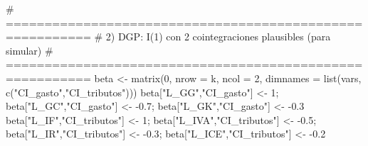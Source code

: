 \documentclass[
  spanish,
  letterpaper,
  DIV=11,
  numbers=noendperiod]{scrartcl}
\newenvironment{Shaded}{\begin{snugshade}}{\end{snugshade}}
\newcommand{\AttributeTok}[1]{\textcolor[rgb]{0.40,0.45,0.13}{#1}}
\newcommand{\CommentTok}[1]{\textcolor[rgb]{0.37,0.37,0.37}{#1}}
\newcommand{\DecValTok}[1]{\textcolor[rgb]{0.68,0.00,0.00}{#1}}
\newcommand{\FloatTok}[1]{\textcolor[rgb]{0.68,0.00,0.00}{#1}}
\newcommand{\FunctionTok}[1]{\textcolor[rgb]{0.28,0.35,0.67}{#1}}
\newcommand{\NormalTok}[1]{\textcolor[rgb]{0.00,0.23,0.31}{#1}}
\newcommand{\OtherTok}[1]{\textcolor[rgb]{0.00,0.23,0.31}{#1}}
\newcommand{\SpecialCharTok}[1]{\textcolor[rgb]{0.37,0.37,0.37}{#1}}
\newcommand{\StringTok}[1]{\textcolor[rgb]{0.13,0.47,0.30}{#1}}
\begin{document}
\begin{Shaded}
\begin{Highlighting}[]
\CommentTok{\# =========================================================}
\CommentTok{\# 2) DGP: I(1) con 2 cointegraciones plausibles (para simular)}
\CommentTok{\# =========================================================}
\NormalTok{beta }\OtherTok{\textless{}{-}} \FunctionTok{matrix}\NormalTok{(}\DecValTok{0}\NormalTok{, }\AttributeTok{nrow =}\NormalTok{ k, }\AttributeTok{ncol =} \DecValTok{2}\NormalTok{, }\AttributeTok{dimnames =} \FunctionTok{list}\NormalTok{(vars, }\FunctionTok{c}\NormalTok{(}\StringTok{"CI\_gasto"}\NormalTok{,}\StringTok{"CI\_tributos"}\NormalTok{)))}
\NormalTok{beta[}\StringTok{"L\_GG"}\NormalTok{,}\StringTok{"CI\_gasto"}\NormalTok{] }\OtherTok{\textless{}{-}} \DecValTok{1}\NormalTok{;   beta[}\StringTok{"L\_GC"}\NormalTok{,}\StringTok{"CI\_gasto"}\NormalTok{] }\OtherTok{\textless{}{-}} \SpecialCharTok{{-}}\FloatTok{0.7}\NormalTok{; beta[}\StringTok{"L\_GK"}\NormalTok{,}\StringTok{"CI\_gasto"}\NormalTok{] }\OtherTok{\textless{}{-}} \SpecialCharTok{{-}}\FloatTok{0.3}
\NormalTok{beta[}\StringTok{"L\_IF"}\NormalTok{,}\StringTok{"CI\_tributos"}\NormalTok{] }\OtherTok{\textless{}{-}} \DecValTok{1}\NormalTok{; beta[}\StringTok{"L\_IVA"}\NormalTok{,}\StringTok{"CI\_tributos"}\NormalTok{] }\OtherTok{\textless{}{-}} \SpecialCharTok{{-}}\FloatTok{0.5}\NormalTok{; beta[}\StringTok{"L\_IR"}\NormalTok{,}\StringTok{"CI\_tributos"}\NormalTok{] }\OtherTok{\textless{}{-}} \SpecialCharTok{{-}}\FloatTok{0.3}\NormalTok{; beta[}\StringTok{"L\_ICE"}\NormalTok{,}\StringTok{"CI\_tributos"}\NormalTok{] }\OtherTok{\textless{}{-}} \SpecialCharTok{{-}}\FloatTok{0.2}


\end{Highlighting}
\end{Shaded}
\end{document}
